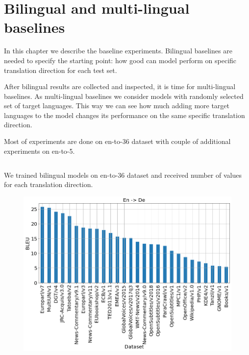\chapter{Bilingual and multi-lingual baselines}

In this chapter we describe the baseline experiments.
Bilingual baselines are needed to specify the starting point:
how good can model perform on specific translation direction
for each test set.

After bilingual results are collected and inspected, it is time for
multi-lingual baselines. As multi-lingual baselines we consider models
with randomly selected set of target languages. This way we can see
how much adding more target languages to the model changes its performance
on the same specific translation direction.

Most of experiments are done on \gls{en-to-36} dataset with couple of
additional experiments on \gls{en-to-5}.




\section{}
\label{section:bilingual_baseline}


We trained bilingual models on \gls{en-to-36} dataset and received
number of values for each translation direction.

\begin{figure}[h]
	\centering
	\includegraphics[width=0.9\columnwidth]{../img/bilingual_en_de.png}
	\label{fig:bilingual_en_de}
\end{figure}


